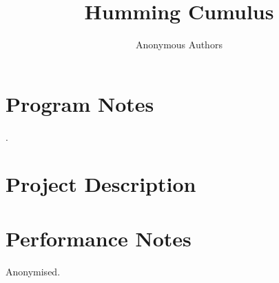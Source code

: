 \documentclass{nimemusic}
\begin{document}
\title{Humming Cumulus}

\author{Anonymous Authors}

\renewcommand{\shortauthors}{Authors, et al.}


\maketitle


\section{Program Notes}
\lipsum[1].


\section{Project Description}
\lipsum[2]

\section{Performance Notes}
\lipsum[3]

\begin{acks}
Anonymised.
\end{acks}

% 
% 
\end{document}
